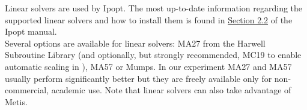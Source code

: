 Linear solvers are used by Ipopt. The most up-to-date information regarding the supported linear solvers and how to install them is found in \href{http://www.coin-or.org/Ipopt/documentation/node14.html}{Section 2.2} of the Ipopt manual.\\

Several options are available for linear solvers: MA27 from the Harwell Subroutine Library (and optionally, but strongly recommended, MC19 to enable automatic scaling in \Ipopt), MA57 or Mumps.
In our experiment MA27 and MA57 usually perform significantly better but they are freely 
available only for non-commercial, academic use. Note that linear solvers can also take advantage of Metis.
